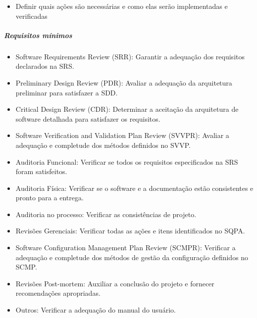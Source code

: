 \begin{itemize}
\begin{itemize}
\item Definir quais ações são necessárias e como elas serão implementadas e verificadas

\end{itemize}

\subparagraph{Requisitos mínimos}

\begin{itemize}

\item Software Requirements Review (SRR): Garantir a adequação dos requisitos declarados na SRS.

\item Preliminary Design Review (PDR): Avaliar a adequação da arquitetura preliminar para satisfazer a SDD.

\item Critical Design Review (CDR): Determinar a aceitação da arquitetura de software detalhada para satisfazer os requisitos.

\item Software Verification and Validation Plan Review (SVVPR): Avaliar a adequação e completude dos métodos definidos no SVVP.

\item Auditoria Funcional: Verificar se todos os requisitos especificados na SRS foram satisfeitos.

\item Auditoria Física: Verificar se o software e a documentação estão consistentes e pronto para a entrega.

\item Auditoria no processo: Verificar as consistências de projeto.

\item Revisões Gerenciais: Verificar todas as ações e itens identificados no SQPA.

\item Software Configuration Management Plan Review (SCMPR): Verificar a adequação e completude dos métodos de gestão da configuração definidos no SCMP.

\item Revisões Post-mortem: Auxiliar a conclusão do projeto e fornecer recomendações apropriadas.

\item Outros: Verificar a adequação do manual do usuário.

\end{itemize}


\end{itemize}

